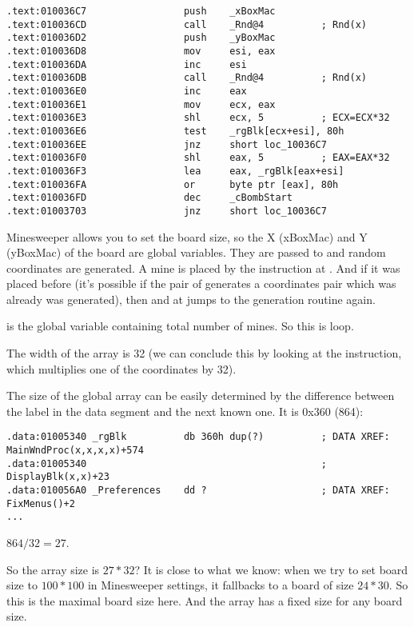 \begin{lstlisting}
.text:010036C7                 push    _xBoxMac
.text:010036CD                 call    _Rnd@4          ; Rnd(x)
.text:010036D2                 push    _yBoxMac
.text:010036D8                 mov     esi, eax
.text:010036DA                 inc     esi
.text:010036DB                 call    _Rnd@4          ; Rnd(x)
.text:010036E0                 inc     eax
.text:010036E1                 mov     ecx, eax
.text:010036E3                 shl     ecx, 5          ; ECX=ECX*32
.text:010036E6                 test    _rgBlk[ecx+esi], 80h
.text:010036EE                 jnz     short loc_10036C7
.text:010036F0                 shl     eax, 5          ; EAX=EAX*32
.text:010036F3                 lea     eax, _rgBlk[eax+esi]
.text:010036FA                 or      byte ptr [eax], 80h
.text:010036FD                 dec     _cBombStart
.text:01003703                 jnz     short loc_10036C7
\end{lstlisting}

Minesweeper allows you to set the board size, so the X (xBoxMac) and Y (yBoxMac) of the board are global variables.
They are passed to  and random 
coordinates are generated.
A mine is placed by the  instruction at . 
And if it was placed before 
(it's possible if the pair of  
generates a coordinates pair which was already 
was generated), 
then  and  at  
jumps to the generation routine again.

 is the global variable containing total number of mines. So this is loop.

The width of the array is 32 
(we can conclude this by looking at the  instruction, which multiplies one of the coordinates by 32).

The size of the  
global array can be easily determined by the difference 
between the  
label in the data segment and the next known one. 
It is 0x360 (864):

\begin{lstlisting}
.data:01005340 _rgBlk          db 360h dup(?)          ; DATA XREF: MainWndProc(x,x,x,x)+574
.data:01005340                                         ; DisplayBlk(x,x)+23
.data:010056A0 _Preferences    dd ?                    ; DATA XREF: FixMenus()+2
...
\end{lstlisting}

$864/32=27$.

So the array size is $27*32$?
It is close to what we know: when we try to set board size to $100*100$ in Minesweeper settings, it fallbacks to a board of size $24*30$.
So this is the maximal board size here.
And the array has a fixed size for any board size.

